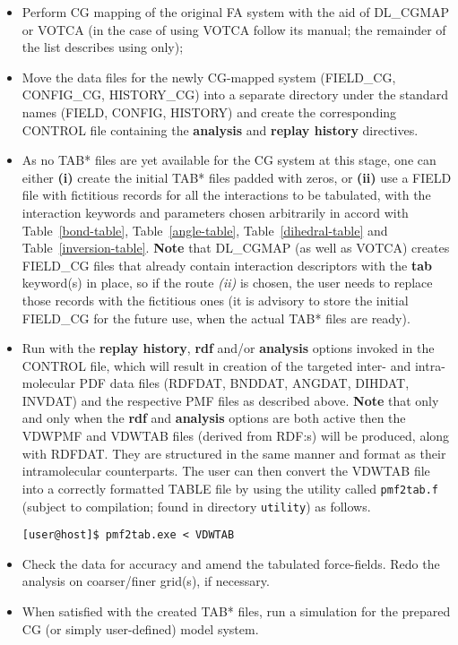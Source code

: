 \begin{itemize}
\item Perform CG mapping of the original FA system with the aid
of DL\_CGMAP or VOTCA (in the case of using VOTCA follow its manual;
the remainder of the list describes using \D only);
\item Move the data files for the newly CG-mapped system
(FIELD\_CG, CONFIG\_CG, HISTORY\_CG) into a separate directory
under the standard names (FIELD, CONFIG, HISTORY) and create
the corresponding CONTROL file containing the {\bf analysis}
and {\bf replay history} directives.
\item As no TAB* files are yet available for the CG system
at this stage, one can either {\bf (i)} create the initial TAB* files
padded with zeros, or {\bf (ii)} use a FIELD file with fictitious records
for all the interactions to be tabulated, with the interaction
keywords and parameters chosen arbitrarily in accord with
Table~\ref{bond-table}, Table~\ref{angle-table},
Table~\ref{dihedral-table} and Table~\ref{inversion-table}.
{\bf Note} that DL\_CGMAP (as well as VOTCA) creates FIELD\_CG files
that already contain interaction descriptors with the {\bf tab}
keyword(s) in place, so if the route {\em (ii)} is chosen,
the user needs to replace those records with the fictitious ones
(it is advisory to store the initial FIELD\_CG for the future
use, when the actual TAB* files are ready).
\item Run \D with the {\bf replay history}, {\bf rdf} and/or
{\bf analysis} options invoked in the CONTROL file, which
will result in creation of the targeted inter- and intra-molecular
PDF data files (RDFDAT, BNDDAT, ANGDAT, DIHDAT, INVDAT) and the
respective PMF files as described above.  {\bf Note} that only
and only when the {\bf rdf} and {\bf analysis} options are both
active then the VDWPMF and VDWTAB files (derived from RDF:s) will
be produced, along with RDFDAT.  They are structured in the same
manner and format as their intramolecular counterparts.  The user
can then convert the VDWTAB file into a correctly formatted TABLE
file by using the utility called {\tt pmf2tab.f} (subject to
compilation; found in \D directory {\tt utility}) as follows.


\begin{lstlisting}
[user@host]$ pmf2tab.exe < VDWTAB
\end{lstlisting}

\item Check the data for accuracy and amend the tabulated
force-fields. Redo the analysis on coarser/finer grid(s),
if necessary.

\item When satisfied with the created TAB* files, run
a \D simulation for the prepared CG (or simply user-defined)
model system.
\end{itemize}
